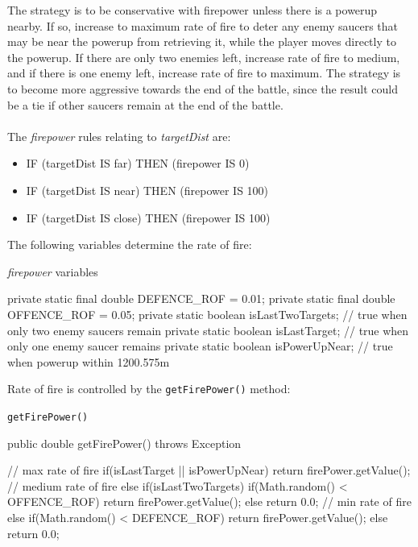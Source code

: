 The strategy is to be conservative with firepower unless there is a powerup nearby. If so, increase to maximum rate of fire to deter any enemy saucers that may be near the powerup from retrieving it, while the player moves directly to the powerup. If there are only two enemies left, increase rate of fire to medium, and if there is one enemy left, increase rate of fire to maximum. The strategy is to become more aggressive towards the end of the battle, since the result could be a tie if other saucers remain at the end of the battle.
\\
\\
The \emph{firepower} rules relating to \emph{targetDist} are:

\begin{itemize}
\item IF (targetDist IS far) THEN (firepower IS 0)
\item IF (targetDist IS near) THEN (firepower IS 100)
\item IF (targetDist IS close) THEN (firepower IS 100)
\end{itemize}

\noindent
The following variables determine the rate of fire:

\begin{listing}[H]
\caption{\emph{firepower} variables}
\begin{javacode}
private static final double DEFENCE_ROF = 0.01;
private static final double OFFENCE_ROF = 0.05;
private static boolean isLastTwoTargets; // true when only two enemy saucers remain
private static boolean isLastTarget; // true when only one enemy saucer remains
private static boolean isPowerUpNear; // true when powerup within 1200.575m
\end{javacode}
\end{listing}

\noindent
Rate of fire is controlled by the \texttt{getFirePower()} method:

\begin{listing}[H]
\caption{\texttt{getFirePower()}}
\begin{javacode}
public double getFirePower() throws Exception {

    // max rate of fire
    if(isLastTarget || isPowerUpNear) {
        return firePower.getValue();
    // medium rate of fire
    } else if(isLastTwoTargets) {
        if(Math.random() < OFFENCE_ROF) {
            return firePower.getValue();
        } else {
            return 0.0;
        }
    // min rate of fire
    } else {
        if(Math.random() < DEFENCE_ROF) {
            return firePower.getValue();
        } else {
            return 0.0;
        }
    }
}
\end{javacode}
\end{listing}

